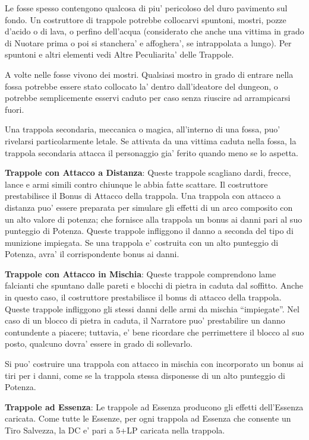 \documentclass[a4paper,11pt,twoside,openany]{dndbook}
\begin{document}
{Le fosse spesso contengono qualcosa di piu' pericoloso del duro pavimento sul fondo. Un costruttore di trappole potrebbe collocarvi spuntoni, mostri, pozze d'acido o di lava, o perfino dell'acqua (considerato che anche una vittima in grado di Nuotare prima o poi si stanchera' e affoghera', se intrappolata a lungo). Per spuntoni e altri elementi vedi Altre Peculiarita' delle Trappole.

A volte nelle fosse vivono dei mostri. Qualsiasi mostro in grado di entrare nella fossa potrebbe essere stato collocato la' dentro dall'ideatore del dungeon, o potrebbe semplicemente esservi caduto per caso senza riuscire ad arrampicarsi fuori.

Una trappola secondaria, meccanica o magica, all'interno di una fossa, puo' rivelarsi particolarmente letale. Se attivata da una vittima caduta nella fossa, la trappola secondaria attacca il personaggio gia' ferito quando meno se lo aspetta.

\textbf{Trappole con Attacco a Distanza}: Queste trappole scagliano dardi, frecce, lance e armi simili contro chiunque le abbia fatte scattare. Il costruttore prestabilisce il Bonus di Attacco della trappola. Una trappola con attacco a distanza puo' essere preparata per simulare gli effetti di un arco composito con un alto valore di potenza; che fornisce alla trappola un bonus ai danni pari al suo punteggio di Potenza. Queste trappole infliggono il danno a seconda del tipo di munizione impiegata. Se una trappola e' costruita con un alto punteggio di Potenza, avra' il corrispondente bonus ai danni.

\textbf{Trappole con Attacco in Mischia}: Queste trappole comprendono lame falcianti che spuntano dalle pareti e blocchi di pietra in caduta dal soffitto. Anche in questo caso, il costruttore prestabilisce il bonus di attacco della trappola. Queste trappole infliggono gli stessi danni delle armi da mischia ``impiegate''. Nel caso di un blocco di pietra in caduta, il Narratore puo' prestabilire un danno contundente a piacere; tuttavia, e' bene ricordare che perrimettere il blocco al suo posto, qualcuno dovra' essere in grado di sollevarlo.

Si puo' costruire una trappola con attacco in mischia con incorporato un bonus ai tiri per i danni, come se la trappola stessa disponesse di un alto punteggio di Potenza.

\textbf{Trappole ad Essenza}: Le trappole ad Essenza producono gli effetti dell'Essenza caricata. Come tutte le Essenze, per ogni trappola ad Essenza che consente un Tiro Salvezza, la DC e' pari a 5+LP caricata nella trappola.

}
\end{document}
